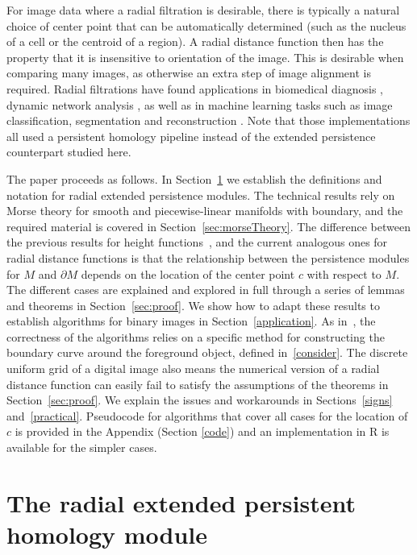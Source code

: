 \documentclass[a4paper,11pt]{article}
\theoremstyle{definition}
\begin{document}
For image data where a radial filtration is desirable, there is typically a natural choice of center point that can be automatically determined (such as the nucleus of a cell or the centroid of a region). 
A radial distance function then has the property that it is insensitive to orientation of the image. 
This is desirable when comparing many images, as otherwise an extra step of image alignment is required. 
Radial filtrations have found applications in biomedical diagnosis \cite{A2020,D2024,J2025}, dynamic network analysis \cite{S2022}, as well as in machine learning tasks such as image classification, segmentation and reconstruction \cite{C2022,G2019,N2024,T2021}. Note that those implementations all used a persistent homology pipeline instead of the extended persistence counterpart studied here. 

The paper proceeds as follows. In Section~\ref{sec:bg} we establish the definitions and notation for radial extended persistence modules. The technical results rely on Morse theory for smooth and piecewise-linear manifolds with boundary, and the required material is covered in Section~\ref{sec:morseTheory}. 
The difference between the previous results for height functions~\cite{KT2022}, and the current analogous ones for radial distance functions is that the relationship between the persistence modules for $M$ and $\partial M$ depends on the location of the center point $c$ with respect to $M$. The different cases are explained and explored in full through a series of lemmas and theorems in Section~\ref{sec:proof}. 
We show how to adapt these results to establish algorithms for binary images in Section~\ref{application}. 
As in~\cite{KT2022}, the correctness of the algorithms relies on a specific method for constructing the boundary curve around the foreground object, defined in~\ref{consider}. The discrete uniform grid of a digital image also means the numerical version of a radial distance function can easily fail to satisfy the assumptions of the theorems in Section~\ref{sec:proof}. We explain the issues and workarounds in Sections~\ref{signs} and~\ref{practical}.
Pseudocode for algorithms that cover all cases for the location of $c$ is provided in the Appendix (Section \ref{code}) and an implementation in R is available for the simpler cases. 




\section{The radial extended persistent homology module}
\label{sec:bg}
\end{document}
